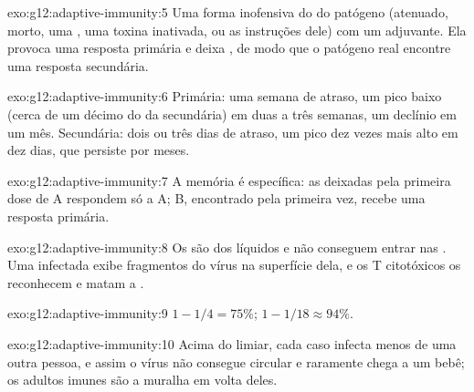\begin{solution}{exo:g12:adaptive-immunity:5}
Uma forma inofensiva do  do patógeno (atenuado, morto, uma
, uma toxina inativada, ou as instruções dele) com um
adjuvante. Ela provoca uma resposta primária e deixa , de modo que o patógeno real encontre uma resposta secundária.
\end{solution}

\begin{solution}{exo:g12:adaptive-immunity:6}
Primária: uma semana de atraso, um pico baixo (cerca de um décimo do da
secundária) em duas a três semanas, um declínio em um mês.
Secundária: dois ou três dias de atraso, um pico dez vezes mais alto em
dez dias, que persiste por meses.
\end{solution}

\begin{solution}{exo:g12:adaptive-immunity:7}
A memória é específica: as  deixadas pela primeira
dose de A respondem só a A; B, encontrado pela primeira vez, recebe uma
resposta primária.
\end{solution}

\begin{solution}{exo:g12:adaptive-immunity:8}
Os  são  dos líquidos e não conseguem entrar nas
. Uma  infectada exibe fragmentos do vírus na superfície
dela, e os  T citotóxicos os reconhecem e matam a .
\end{solution}

\begin{solution}{exo:g12:adaptive-immunity:9}
$1 - 1/4 = 75\%$; $1 - 1/18 \approx 94\%$.
\end{solution}

\begin{solution}{exo:g12:adaptive-immunity:10}
Acima do limiar, cada caso infecta menos de uma outra pessoa, e assim o
vírus não consegue circular e raramente chega a um bebê; os adultos
imunes são a muralha em volta deles.
\end{solution}


